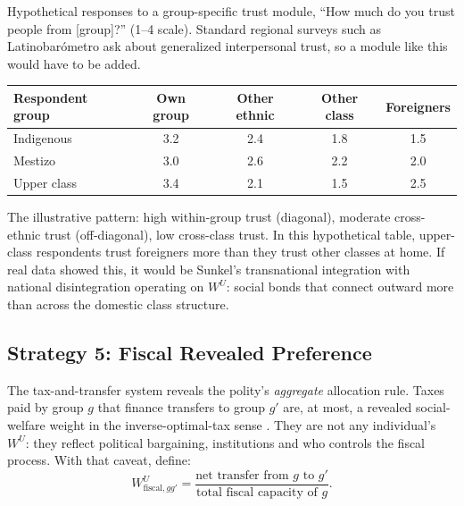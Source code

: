 \documentclass[../structural_economics_book.tex]{subfiles}
\begin{document}
\begin{example}\label{ch22:ex:social_cohesion}
Hypothetical responses to a group-specific trust module, ``How much do you trust people from [group]?'' (1--4 scale). Standard regional surveys such as Latinobar\'{o}metro ask about generalized interpersonal trust, so a module like this would have to be added. %

\begin{center}
\begin{tabularx}{\textwidth}{Lcccc}
\toprule
Respondent group & Own group & Other ethnic & Other class & Foreigners \\
\midrule
Indigenous & 3.2 & 2.4 & 1.8 & 1.5 \\
Mestizo & 3.0 & 2.6 & 2.2 & 2.0 \\
Upper class & 3.4 & 2.1 & 1.5 & 2.5 \\
\bottomrule
\end{tabularx}
\end{center}

The illustrative pattern: high within-group trust (diagonal), moderate cross-ethnic trust (off-diagonal), low cross-class trust. In this hypothetical table, upper-class respondents trust foreigners more than they trust other classes at home. If real data showed this, it would be Sunkel's transnational integration with national disintegration operating on $W^U$: social bonds that connect outward more than across the domestic class structure.
\end{example}


\subsection{Strategy 5: Fiscal Revealed Preference}

\begin{definition}[Fiscal $W^U$]\label{ch22:def:fiscal}
The tax-and-transfer system reveals the polity's \textit{aggregate} allocation rule. Taxes paid by group $g$ that finance transfers to group $g'$ are, at most, a revealed social-welfare weight in the inverse-optimal-tax sense \citep[e.g.,][]{bourguignon2012tax}. They are not any individual's $W^U$: they reflect political bargaining, institutions and who controls the fiscal process. With that caveat, define:
\begin{equation}\label{ch22:eq:fiscal_WU}
W^U_{\text{fiscal}, gg'} = \frac{\text{net transfer from } g \text{ to } g'}{\text{total fiscal capacity of } g}.
\end{equation}
\end{definition}
\end{document}
